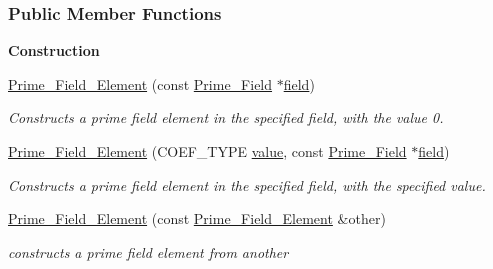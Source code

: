 \subsubsection*{Public Member Functions}
\begin{Indent}\textbf{ Construction}\par
\begin{DoxyCompactItemize}
\item 
\hyperlink{group___fields_group_ac4a46053696a327bc62038e1cf92c20a}{Prime\+\_\+\+Field\+\_\+\+Element} (const \hyperlink{group___fields_group_class_prime___field}{Prime\+\_\+\+Field} $\ast$\hyperlink{group___fields_group_a30f455dd34d4e795c63791cdc7ea1f46}{field})
\begin{DoxyCompactList}\small\item\em Constructs a prime field element in the specified field, with the value 0. \end{DoxyCompactList}\item 
\hyperlink{group___fields_group_a0bad5ba05aadbaf14876b2590e300861}{Prime\+\_\+\+Field\+\_\+\+Element} (C\+O\+E\+F\+\_\+\+T\+Y\+PE \hyperlink{group___fields_group_aa9c68761643afa0b22863904bdfe7e83}{value}, const \hyperlink{group___fields_group_class_prime___field}{Prime\+\_\+\+Field} $\ast$\hyperlink{group___fields_group_a30f455dd34d4e795c63791cdc7ea1f46}{field})
\begin{DoxyCompactList}\small\item\em Constructs a prime field element in the specified field, with the specified value. \end{DoxyCompactList}\item 
\mbox{\label{group___fields_group_a2d138dd43fec2bec179cbc6eea6ca3a7}} 
\hyperlink{group___fields_group_a2d138dd43fec2bec179cbc6eea6ca3a7}{Prime\+\_\+\+Field\+\_\+\+Element} (const \hyperlink{group___fields_group_class_prime___field___element}{Prime\+\_\+\+Field\+\_\+\+Element} \&other)
\begin{DoxyCompactList}\small\item\em constructs a prime field element from another \end{DoxyCompactList}\end{DoxyCompactItemize}
\end{Indent}

